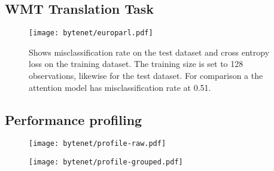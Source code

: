 \clearpage
\subsection{WMT Translation Task}

\begin{figure}[H]
    \centering
    \texttt{[image: bytenet/europarl.pdf]}
    \caption{Shows misclassification rate on the test dataset and cross entropy loss on the training dataset. The training size is set to 128 observations, likewise for the test dataset. For comparison a the attention model has misclassification rate at 0.51.}
\end{figure}

\subsection{Performance profiling}

\begin{figure}[H]
    \centering
    \texttt{[image: bytenet/profile-raw.pdf]}
    \caption{}
\end{figure}


\begin{figure}[H]
    \centering
    \texttt{[image: bytenet/profile-grouped.pdf]}
    \caption{}
\end{figure}
